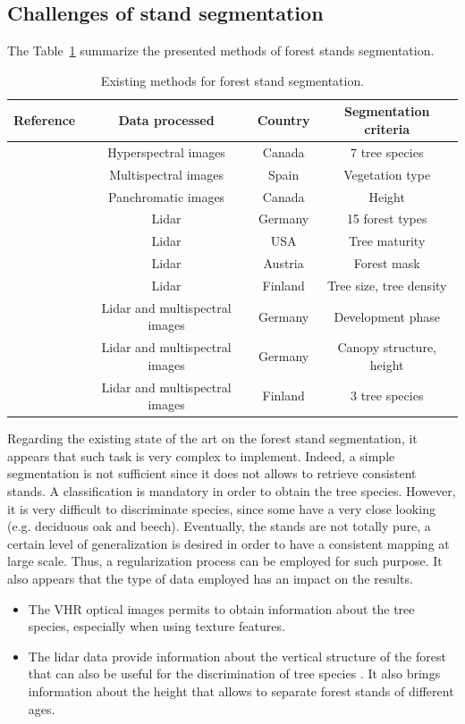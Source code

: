 \subsection{Challenges of stand segmentation}
The Table~\ref{table:methods} summarize the presented methods of forest stands segmentation. 
\begin{table}
\begin{tabular}{|l|c|c|c|}
\hline
Reference & Data processed & Country & Segmentation criteria \\
\hline
\cite{leckie2003stand} & Hyperspectral images & Canada & 7 tree species \\
\hline
\cite{hernando2012spatial} & Multispectral images & Spain & Vegetation type \\
\hline
\cite{Mora20102474} & Panchromatic images & Canada & Height \\
\hline
\cite{koch2009airborne} & Lidar & Germany & 15 forest types \\
\hline
\cite{sullivan2009object} & Lidar & USA & Tree maturity \\
\hline
\cite{eysn2012forest} & Lidar &  Austria & Forest mask \\
\hline
\cite{wu2014data} & Lidar & Finland & Tree size, tree density \\
\hline
\cite{tiede2004object} & Lidar and multispectral images & Germany & Development phase \\
\hline
\cite{diedershagen2004automatic} & Lidar and multispectral images & Germany & Canopy structure, height \\
\hline
\cite{leppanen2008automatic} & Lidar and multispectral images & Finland & 3 tree species \\
\hline
\end{tabular}
\caption{Existing methods for forest stand segmentation.}
\label{table:methods}
\end{table}

Regarding the existing state of the art on the forest stand segmentation, it appears that such task is very complex to implement. Indeed, a simple segmentation is not sufficient since it does not allows to retrieve consistent stands. A classification is mandatory in order to obtain the tree species. However, it is very difficult to discriminate species, since some have a very close looking (e.g. deciduous oak and beech). Eventually, the stands are not totally pure, a certain level of generalization is desired in order to have a consistent mapping at large scale. Thus, a regularization process can be employed for such purpose.
It also appears that the type of data employed has an impact on the results.
\begin{itemize}
\item The VHR optical images permits to obtain information about the tree species, especially when using texture features.
\item The lidar data provide information about the vertical structure of the forest that can also be useful for the discrimination of tree species \citep{brandtberg2007classifying}. It also brings information about the height that allows to separate forest stands of different ages.
\end{itemize}

